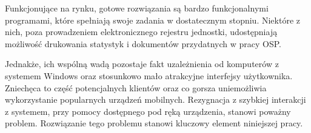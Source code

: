 Funkcjonujące na rynku, gotowe rozwiązania są bardzo funkcjonalnymi programami, które spełniają swoje zadania w dostatecznym stopniu. Niektóre z nich, poza prowadzeniem elektronicznego rejestru jednostki, udostępniają możliwość drukowania statystyk i dokumentów przydatnych w pracy OSP.

Jednakże, ich wspólną wadą pozostaje fakt uzależnienia od komputerów z systemem Windows oraz stosunkowo mało atrakcyjne interfejsy użytkownika. Zniechęca to część potencjalnych klientów oraz co gorsza uniemożliwia wykorzystanie popularnych urządzeń mobilnych. Rezygnacja z szybkiej interakcji z systemem, przy pomocy dostępnego pod ręką urządzenia, stanowi poważny problem. Rozwiązanie tego problemu stanowi kluczowy element niniejszej pracy.
